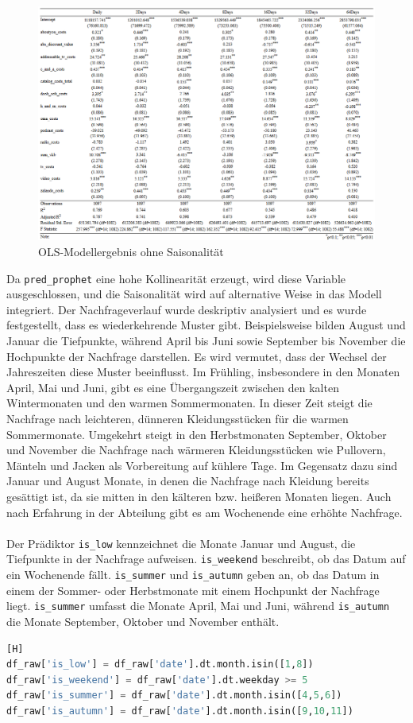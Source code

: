 \begin{figure}[H]
    \centering
    \includegraphics[width=1\linewidth]{images/ols2.png}
    \caption{\ac{OLS}-Modellergebnis ohne Saisonalität}
    \label{fig:OLSohneSaison}
\end{figure}
\noindent
Da \verb|pred_prophet| eine hohe Kollinearität erzeugt, wird diese Variable ausgeschlossen, und die Saisonalität wird auf alternative Weise in das Modell integriert. Der Nachfrageverlauf wurde deskriptiv analysiert und es wurde festgestellt, dass es wiederkehrende Muster gibt. Beispielsweise bilden August und Januar die Tiefpunkte, während April bis Juni sowie September bis November die Hochpunkte der Nachfrage darstellen. Es wird vermutet, dass der Wechsel der Jahreszeiten diese Muster beeinflusst. Im Frühling, insbesondere in den Monaten April, Mai und Juni, gibt es eine Übergangszeit zwischen den kalten Wintermonaten und den warmen Sommermonaten. In dieser Zeit steigt die Nachfrage nach leichteren, dünneren Kleidungsstücken für die warmen Sommermonate. Umgekehrt steigt in den Herbstmonaten September, Oktober und November die Nachfrage nach wärmeren Kleidungsstücken wie Pullovern, Mänteln und Jacken als Vorbereitung auf kühlere Tage. Im Gegensatz dazu sind Januar und August Monate, in denen die Nachfrage nach Kleidung bereits gesättigt ist, da sie mitten in den kälteren bzw. heißeren Monaten liegen. Auch nach Erfahrung in der Abteilung gibt es am Wochenende eine erhöhte Nachfrage. \\\\
Der Prädiktor \verb|is_low| kennzeichnet die Monate Januar und August, die Tiefpunkte in der Nachfrage aufweisen. \verb|is_weekend| beschreibt, ob das Datum auf ein Wochenende fällt. \verb|is_summer| und \verb|is_autumn| geben an, ob das Datum in einem der Sommer- oder Herbstmonate mit einem Hochpunkt der Nachfrage liegt. \verb|is_summer| umfasst die Monate April, Mai und Juni, während \verb|is_autumn| die Monate September, Oktober und November enthält.
\begin{lstlisting}[language=Python, linewidth=\textwidth][H]
df_raw['is_low'] = df_raw['date'].dt.month.isin([1,8])
df_raw['is_weekend'] = df_raw['date'].dt.weekday >= 5  
df_raw['is_summer'] = df_raw['date'].dt.month.isin([4,5,6])  
df_raw['is_autumn'] = df_raw['date'].dt.month.isin([9,10,11]) 
\end{lstlisting}

